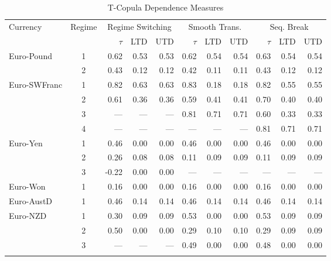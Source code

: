 \documentclass[12pt]{article}
\begin{document}
\begin{table}
\caption{T-Copula Dependence Measures}
\begin{threeparttable}
	\begin{tabular}[c]{l c r r r | r r r | r r r}
\hline \hline
\noalign{\smallskip}
Currency & Regime & \multicolumn{3}{c}{Regime Switching} & \multicolumn{3}{c}{Smooth Trans.} & \multicolumn{3}{c}{Seq. Break} \\
\noalign{\smallskip}
\hline
\noalign{\smallskip}
 & & $\tau$ & LTD & UTD & $\tau$ & LTD & UTD & $\tau$ & LTD & UTD \\
 \noalign{\smallskip}
\hline
\noalign{\smallskip}
Euro-Pound & 1 & 0.62  & 0.53  & 0.53  & 0.62  & 0.54  & 0.54  & 0.63  & 0.54  & 0.54  \\
		   & 2 & 0.43  & 0.12  & 0.12  & 0.42  & 0.11  & 0.11  & 0.43  & 0.12  & 0.12  \\
\noalign{\smallskip} \noalign{\smallskip}
Euro-SWFranc & 1 & 0.82  & 0.63  & 0.63  & 0.83  & 0.18  & 0.18  & 0.82  & 0.55  & 0.55  \\
		     & 2 & 0.61  & 0.36  & 0.36  & 0.59  & 0.41  & 0.41  & 0.70  & 0.40  & 0.40  \\
		     & 3 & --- & --- & --- & 0.81 & 0.71  & 0.71  & 0.60  & 0.33  & 0.33  \\
		     & 4 & --- & --- & --- & ---  & ---  & ---  & 0.81  & 0.71  & 0.71  \\
\noalign{\smallskip} \noalign{\smallskip}
Euro-Yen & 1 & 0.46 & 0.00 & 0.00 & 0.46 & 0.00 & 0.00  & 0.46  & 0.00  & 0.00  \\
		 & 2 & 0.26 & 0.08 & 0.08 & 0.11 & 0.09 & 0.09  & 0.11  & 0.09  & 0.09  \\
		 & 3 & -0.22 & 0.00 & 0.00 & ---  & ---  & ---  & ---  & ---  & ---  \\
\noalign{\smallskip} \noalign{\smallskip}
Euro-Won & 1 & 0.16 & 0.00 & 0.00 & 0.16  & 0.00  & 0.00  & 0.16  & 0.00  & 0.00  \\
\noalign{\smallskip} \noalign{\smallskip}
Euro-AustD & 1 & 0.46 & 0.14 & 0.14 & 0.46  & 0.14  & 0.14  & 0.46  & 0.14  & 0.14  \\
\noalign{\smallskip} \noalign{\smallskip}
Euro-NZD & 1 & 0.30 & 0.09 & 0.09 & 0.53  & 0.00 & 0.00  & 0.53  & 0.09  & 0.09  \\
		 & 2 & 0.50 & 0.00 & 0.00 & 0.29  & 0.10 & 0.10  & 0.29  & 0.09  & 0.09  \\
		 & 3 & --- & --- & --- & 0.49  & 0.00  & 0.00  & 0.48  & 0.00  & 0.00  \\
\noalign{\smallskip}
\hline

\end{tabular}
\end{threeparttable}
\end{table}
\end{document}
